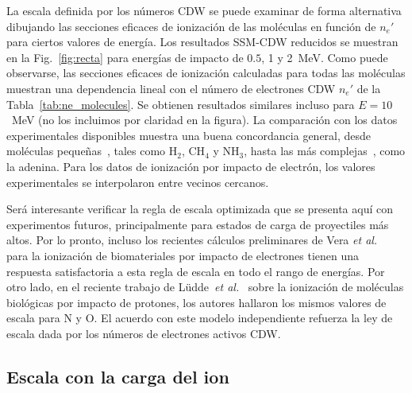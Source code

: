 La escala definida por los números CDW se puede examinar de forma 
alternativa dibujando las secciones eficaces de ionización de las 
moléculas en función de $n_e'$ para ciertos valores de energía. Los 
resultados SSM-CDW reducidos se muestran en la Fig.~\ref{fig:recta} para 
energías de impacto de $0.5$, 1 y 2~MeV. Como puede observarse, las 
secciones eficaces de ionización calculadas para todas las moléculas 
muestran una dependencia lineal con el número de electrones CDW $n_e'$ 
de la Tabla~\ref{tab:ne_molecules}. Se obtienen resultados similares 
incluso para $E=10$~MeV (no los incluimos por claridad en la figura). La 
comparación con los datos experimentales disponibles muestra una buena 
concordancia general, desde moléculas pequeñas~\cite{Lynch:76,Rudd:85,
Luna2007}, tales como H$_2$, CH$_4$ y NH$_3$, hasta las más 
complejas~\cite{Iriki:11,itoh2013,wolff2014}, como la adenina. Para los 
datos de ionización por impacto de electrón, los valores experimentales 
se interpolaron entre vecinos cercanos. 

Será interesante verificar la regla de escala optimizada que se presenta
aquí con experimentos futuros, principalmente para estados de carga de 
proyectiles más altos. Por lo pronto, incluso los recientes cálculos 
preliminares de Vera \textit{et al.}~\cite{deVera:20} para la ionización 
de biomateriales por impacto de electrones tienen una respuesta 
satisfactoria a esta regla de escala en todo el rango de energías.
Por otro lado, en el reciente trabajo de 
L\"udde~\textit{et al.}~\cite{Ludde:19} sobre la ionización de 
moléculas biológicas por impacto de protones, los autores hallaron los 
mismos valores de escala para N y O. El acuerdo con este modelo 
independiente refuerza la ley de escala dada por los números de 
electrones activos CDW.

\subsection{Escala con la carga del ion}
\label{sec:zscaling}


